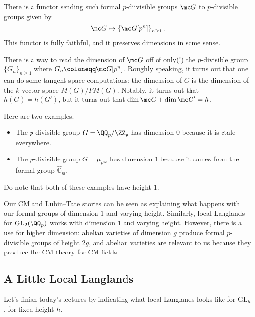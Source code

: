 \documentclass[../notes.tex]{subfiles}
\begin{document}
\begin{remark}
	There is a functor sending such formal $p$-diivisible groups $\mc G$ to $p$-divisible groups given by
	\[\mc G\mapsto\left\{\mc G[p^n]\right\}_{n\ge1}.\]
	This functor is fully faithful, and it preserves dimensions in some sense.
\end{remark}
\begin{remark}
	There is a way to read the dimension of $\mc G$ off of only(!) the $p$-divisible group $\{G_n\}_{n\ge1}$ where $G_n\coloneqq\mc G[p^n]$. Roughly speaking, it turns out that one can do some tangent space computations: the dimension of $G$ is the dimension of the $k$-vector space $M(G)/FM(G)$. Notably, it turns out that $h(G)=h(G')$, but it turns out that $\dim\mc G+\dim\mc G'=h$.
\end{remark}
\begin{example}
	Here are two examples.
	\begin{itemize}
		\item The $p$-divisible group $G=\QQ_p/\ZZ_p$ has dimension $0$ because it is \'etale everywhere.
		\item The $p$-divisible group $G=\mu_{p^\infty}$ has dimension $1$ because it comes from the formal group $\widehat{\mathbb G}_m$.
	\end{itemize}
	Do note that both of these examples have height $1$.
\end{example}
\begin{remark}
	Our CM and Lubin--Tate stories can be seen as explaining what happens with our formal groups of dimension $1$ and varying height. Similarly, local Langlands for $\mathrm{GL}_2(\QQ_p)$ works with dimension $1$ and varying height. However, there is a use for higher dimension: abelian varieties of dimension $g$ produce formal $p$-divisible groups of height $2g$, and abelian varieties are relevant to us because they produce the CM theory for CM fields.
\end{remark}

\subsection{A Little Local Langlands}
Let's finish today's lectures by indicating what local Langlands looks like for $\mathrm{GL}_h$, for fixed height $h$.
\end{document}
